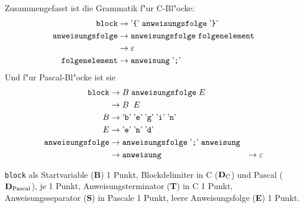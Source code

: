 \begin{loesung}
Zusammengefasst ist die Grammatik f"ur C-Bl"ocke:
\begin{align*}
\texttt{block}
&\rightarrow
\text{'{\tt \{}'}\;\texttt{anweisungsfolge}\; \text{'{\tt\}}'}
\\
\texttt{anweisungsfolge}
&\rightarrow
\texttt{anweisungsfolge}
\;
\texttt{folgenelement}
\\
&\rightarrow\varepsilon
\\
\texttt{folgenelement}
&\rightarrow 
\texttt{anweisung}
\;\text{'{\tt ;}'}
\end{align*}
Und f"ur Pascal-Bl"ocke ist sie
\begin{align*}
\texttt{block}
&\rightarrow
B\; \texttt{anweisungsfolge}\;E
\\
&\rightarrow
B\; \;E
\\
B&\rightarrow
\text{'}\texttt{b}\text{'}\;
\text{'}\texttt{e}\text{'}\;
\text{'}\texttt{g}\text{'}\;
\text{'}\texttt{i}\text{'}\;
\text{'}\texttt{n}\text{'}
\\
E&\rightarrow
\text{'}\texttt{e}\text{'}\;
\text{'}\texttt{n}\text{'}\;
\text{'}\texttt{d}\text{'}
\\
\texttt{anweisungsfolge}
&\rightarrow
\texttt{anweisungsfolge} \; \text{'{\tt ;}'}\; \texttt{anweisung}
\\
&\rightarrow\texttt{anweisung}
&\rightarrow\varepsilon
\end{align*}
\end{loesung}

\begin{bewertung}
\texttt{block} als Startvariable ({\bf B}) 1 Punkt,
Blockdelimiter in C ($\text{{\bf D}}_{\text{C}}$)
und Pascal ($\text{{\bf D}}_{\text{Pascal}}$), je 1 Punkt,
Anweisungsterminator ({\bf T}) in C 1 Punkt,
Anweisungsseparator ({\bf S}) in Pascale 1 Punkt,
leere Anweisungsfolge ({\bf E}) 1 Punkt.
\end{bewertung}

